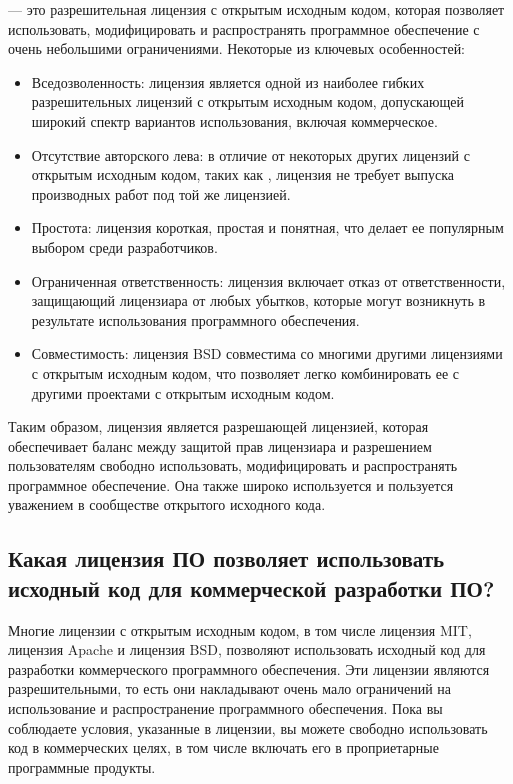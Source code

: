 \documentclass[letterpaper,10pt,russian]{sphinxmanual}
\begin{document}
\sphinxAtStartPar
{} — это разрешительная лицензия с открытым исходным кодом, которая позволяет использовать, модифицировать и распространять программное обеспечение с очень небольшими ограничениями. Некоторые из ключевых особенностей:
\begin{itemize}
\item {} 
\sphinxAtStartPar
Вседозволенность: лицензия  является одной из наиболее гибких разрешительных лицензий с открытым исходным кодом, допускающей широкий спектр вариантов использования, включая коммерческое.

\item {} 
\sphinxAtStartPar
Отсутствие авторского лева: в отличие от некоторых других лицензий с открытым исходным кодом, таких как , лицензия  не требует выпуска производных работ под той же лицензией.

\item {} 
\sphinxAtStartPar
Простота: лицензия  короткая, простая и понятная, что делает ее популярным выбором среди разработчиков.

\item {} 
\sphinxAtStartPar
Ограниченная ответственность: лицензия включает отказ от ответственности, защищающий лицензиара от любых убытков, которые могут возникнуть в результате использования программного обеспечения.

\item {} 
\sphinxAtStartPar
Совместимость: лицензия BSD совместима со многими другими лицензиями с открытым исходным кодом, что позволяет легко комбинировать ее с другими проектами с открытым исходным кодом.

\end{itemize}

\sphinxAtStartPar
Таким образом, лицензия  является разрешающей лицензией, которая обеспечивает баланс между защитой прав лицензиара и разрешением пользователям свободно использовать, модифицировать и распространять программное обеспечение. Она также широко используется и пользуется уважением в сообществе открытого исходного кода.


\subsection{Какая лицензия ПО позволяет использовать исходный код для коммерческой разработки ПО?}
\label{\detokenize{educational_materials/open_license/content:id2}}
\sphinxAtStartPar
Многие лицензии с открытым исходным кодом, в том числе лицензия MIT, лицензия Apache и лицензия BSD, позволяют использовать исходный код для разработки коммерческого программного обеспечения. Эти лицензии являются разрешительными, то есть они накладывают очень мало ограничений на использование и распространение программного обеспечения. Пока вы соблюдаете условия, указанные в лицензии, вы можете свободно использовать код в коммерческих целях, в том числе включать его в проприетарные программные продукты.
\end{document}

